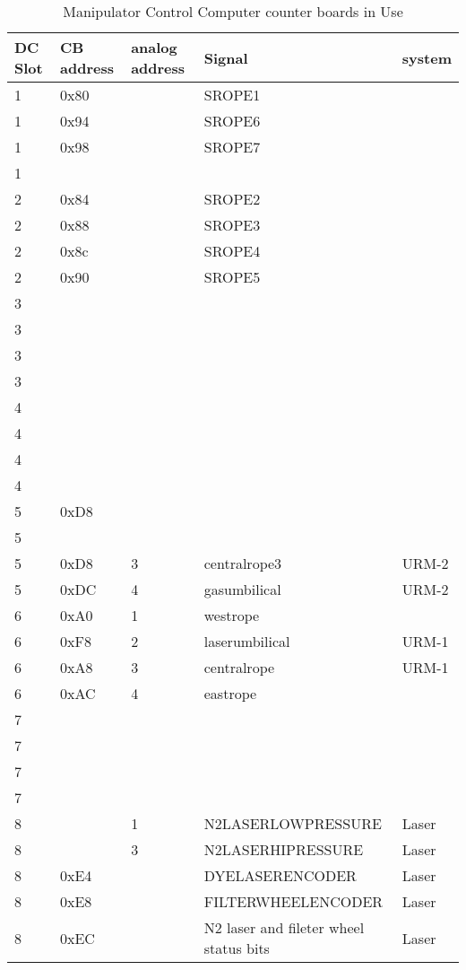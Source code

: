 \begin{table}[htb]
\begin{center}
\begin{tabular}{|l|l|l|l|l|}
\hline
DC Slot & CB address & analog address & Signal & system\\
\hline
 1 & 0x80   &     &  SROPE1  & \\
 1 & 0x94   &     &  SROPE6  & \\
 1 & 0x98   &     &  SROPE7  & \\
 1 &        &     &          & \\
\hline
 2 & 0x84   &     &  SROPE2  & \\
 2 & 0x88   &     &  SROPE3  & \\
 2 & 0x8c   &     &  SROPE4  & \\
 2 & 0x90   &     &  SROPE5  & \\
\hline
 3 &        &     &          & \\
 3 &        &     &          & \\
 3 &        &     &          & \\
 3 &        &     &          & \\
\hline
 4 &        &     &          & \\
 4 &        &     &          & \\
 4 &        &     &          & \\
 4 &        &     &          & \\
\hline
 5 &  0xD8  &     &          & \\
 5 &        &     &          & \\
 5 &  0xD8  & 3   & centralrope3 &  URM-2\\
 5 &  0xDC  & 4   & gasumbilical &  URM-2\\
\hline
 6 &  0xA0  & 1   & westrope       &  \\
 6 &  0xF8  & 2   & laserumbilical & URM-1 \\
 6 &  0xA8  & 3   & centralrope    & URM-1 \\
 6 &  0xAC  & 4   & eastrope       &  \\
\hline
 7 &        &     &          & \\
 7 &        &     &          & \\
 7 &        &     &          & \\
 7 &        &     &          & \\
\hline
 8 &        & 1   & N2LASERLOWPRESSURE       & Laser\\
 8 &        & 3   & N2LASERHIPRESSURE        & Laser\\
 8 &  0xE4  &     & DYELASERENCODER          & Laser \\
 8 &  0xE8  &     & FILTERWHEELENCODER       & Laser \\
 8 &  0xEC  &     & N2 laser and fileter wheel status bits     & Laser\\
\hline
\end{tabular}
\caption[Manipulator Control Computer counter boards in Use]
        {Manipulator Control Computer counter boards in Use
        }
\end{center}
\end{table}


